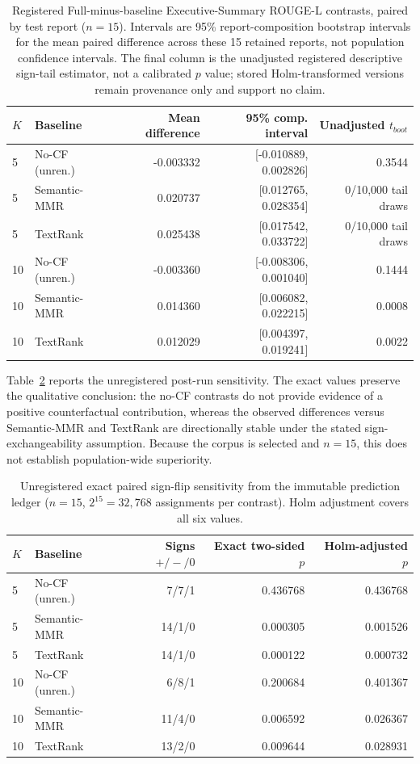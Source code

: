 \documentclass[applsci,article,submit,moreauthors]{Definitions/mdpi}
\begin{document}
\begin{table}[H]
\caption{Registered Full-minus-baseline Executive-Summary ROUGE-L contrasts, paired by test report ($n=15$). Intervals are 95\% report-composition bootstrap intervals for the mean paired difference across these 15 retained reports, not population confidence intervals. The final column is the unadjusted registered descriptive sign-tail estimator, not a calibrated $p$ value; stored Holm-transformed versions remain provenance only and support no claim.}
\label{tab:contrasts}\centering\small
\begin{tabular}{llrrr}
\toprule
$K$ & Baseline & Mean difference & 95\% comp. interval & Unadjusted $t_{boot}$\\
\midrule
5 & No-CF (unren.) & -0.003332 & [-0.010889, 0.002826] & 0.3544\\
5 & Semantic-MMR & 0.020737 & [0.012765, 0.028354] & 0/10,000 tail draws\\
5 & TextRank & 0.025438 & [0.017542, 0.033722] & 0/10,000 tail draws\\
10 & No-CF (unren.) & -0.003360 & [-0.008306, 0.001040] & 0.1444\\
10 & Semantic-MMR & 0.014360 & [0.006082, 0.022215] & 0.0008\\
10 & TextRank & 0.012029 & [0.004397, 0.019241] & 0.0022\\
\bottomrule
\end{tabular}
\end{table}

Table~\ref{tab:signflip} reports the unregistered post-run sensitivity. The exact values preserve the qualitative conclusion: the no-CF contrasts do not provide evidence of a positive counterfactual contribution, whereas the observed differences versus Semantic-MMR and TextRank are directionally stable under the stated sign-exchangeability assumption. Because the corpus is selected and $n=15$, this does not establish population-wide superiority.

\begin{table}[H]
\caption{Unregistered exact paired sign-flip sensitivity from the immutable prediction ledger ($n=15$, $2^{15}=32{,}768$ assignments per contrast). Holm adjustment covers all six values.}
\label{tab:signflip}\centering\small
\begin{tabular}{llrrr}
\toprule
$K$ & Baseline & Signs $+/-/0$ & Exact two-sided $p$ & Holm-adjusted $p$\\
\midrule
5 & No-CF (unren.) & 7/7/1 & 0.436768 & 0.436768\\
5 & Semantic-MMR & 14/1/0 & 0.000305 & 0.001526\\
5 & TextRank & 14/1/0 & 0.000122 & 0.000732\\
10 & No-CF (unren.) & 6/8/1 & 0.200684 & 0.401367\\
10 & Semantic-MMR & 11/4/0 & 0.006592 & 0.026367\\
10 & TextRank & 13/2/0 & 0.009644 & 0.028931\\
\bottomrule
\end{tabular}
\end{table}
\end{document}
